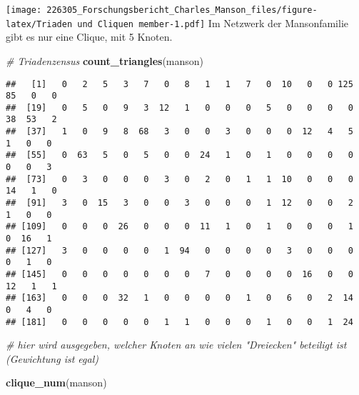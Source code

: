 \documentclass[
]{article}
\newenvironment{Shaded}{\begin{snugshade}}{\end{snugshade}}
\newcommand{\CommentTok}[1]{\textcolor[rgb]{0.56,0.35,0.01}{\textit{#1}}}
\newcommand{\DataTypeTok}[1]{\textcolor[rgb]{0.13,0.29,0.53}{#1}}
\newcommand{\DecValTok}[1]{\textcolor[rgb]{0.00,0.00,0.81}{#1}}
\newcommand{\KeywordTok}[1]{\textcolor[rgb]{0.13,0.29,0.53}{\textbf{#1}}}
\newcommand{\NormalTok}[1]{#1}
\newcommand{\OperatorTok}[1]{\textcolor[rgb]{0.81,0.36,0.00}{\textbf{#1}}}
\newcommand{\StringTok}[1]{\textcolor[rgb]{0.31,0.60,0.02}{#1}}
\begin{document}
\begin{Shaded}
\end{Shaded}

\texttt{[image: 226305\_Forschungsbericht\_Charles\_Manson\_files/figure-latex/Triaden und Cliquen member-1.pdf]}
Im Netzwerk der Mansonfamilie gibt es nur eine Clique, mit 5 Knoten.

\begin{Shaded}
\begin{Highlighting}[]
\CommentTok{# Triadenzensus}
\KeywordTok{count_triangles}\NormalTok{(manson)}
\end{Highlighting}
\end{Shaded}

\begin{verbatim}
##   [1]   0   2   5   3   7   0   8   1   1   7   0  10   0   0 125  85   0   0
##  [19]   0   5   0   9   3  12   1   0   0   0   5   0   0   0   0  38  53   2
##  [37]   1   0   9   8  68   3   0   0   3   0   0   0  12   4   5   1   0   0
##  [55]   0  63   5   0   5   0   0  24   1   0   1   0   0   0   0   0   0   3
##  [73]   0   3   0   0   0   3   0   2   0   1   1  10   0   0   0  14   1   0
##  [91]   3   0  15   3   0   0   3   0   0   0   1  12   0   0   2   1   0   0
## [109]   0   0   0  26   0   0   0  11   1   0   1   0   0   0   1   0  16   1
## [127]   3   0   0   0   0   1  94   0   0   0   0   3   0   0   0   0   1   0
## [145]   0   0   0   0   0   0   0   7   0   0   0   0  16   0   0  12   1   1
## [163]   0   0   0  32   1   0   0   0   0   1   0   6   0   2  14   0   4   0
## [181]   0   0   0   0   0   1   1   0   0   0   1   0   0   1  24
\end{verbatim}

\begin{Shaded}
\begin{Highlighting}[]
\CommentTok{# hier wird ausgegeben, welcher Knoten an wie vielen "Dreiecken" beteiligt ist (Gewichtung ist egal)}

\KeywordTok{clique_num}\NormalTok{(manson)}
\end{Highlighting}
\end{Shaded}
\end{document}
